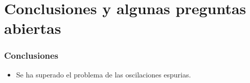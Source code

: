 \section{Conclusiones y algunas preguntas abiertas}

\begin{frame}
	\frametitle{Conclusiones}

	\begin{itemize}
		\item Se ha superado el problema de las oscilaciones espurias.
	\end{itemize}
\end{frame}
